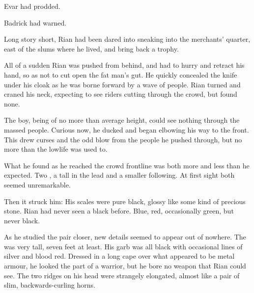  Evar had prodded. 

 Badrick had warned. 

Long story short, Rian had been dared into sneaking into the merchants' quarter, east of the slums where he lived, and bring back a trophy. 


All of a sudden Rian was pushed from behind, and had to hurry and retract his hand, so as not to cut open the fat man's gut. He quickly concealed the knife under his cloak as he was borne forward by a wave of people. Rian turned and craned his neck, expecting to see riders cutting through the crowd, but found none. 


The boy, being of no more than average height, 
could see nothing through the massed people. Curious now, he ducked and began elbowing his way to the front. This drew curses and the odd blow from the people he pushed through, but no more than the lowlife was used to. 

What he found as he reached the crowd frontline was both more and less than he expected. Two \scathae, a tall \dax{} in the lead and a smaller \sphyle{} following. %
At first sight both seemed unremarkable. 


Then it struck him: 
 His scales were pure black, glossy like some kind of precious stone. Rian had never seen a black \scatha{} before. Blue, red, occasionally green, but never black. 

As he studied the pair closer, new details seemed to appear out of nowhere. The \dax{} was very tall, seven feet at least. His garb was all black with occasional lines of silver and blood red. Dressed in a long cape over what appeared to be metal armour, he looked the part of a warrior, but he bore no weapon that Rian could see. 
The two ridges on his head were strangely elongated, almost like a pair of slim, backwards-curling horns. 

